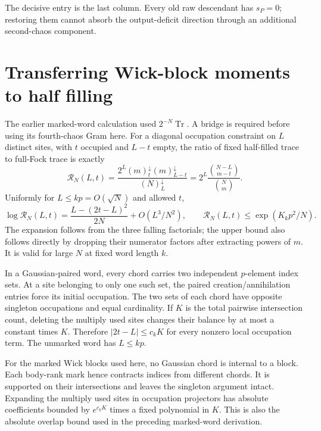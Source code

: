 \documentclass[11pt,a4paper]{article}
\begin{document}
The decisive entry is the last column. Every old raw descendant
has $s_P=0$; restoring them cannot absorb the output-deficit
direction through an additional second-chaos component.

\newpage
\section{Transferring Wick-block moments to half filling}
The earlier marked-word calculation used $2^{-N}\operatorname{Tr}$.
A bridge is required before using its fourth-chaos Gram here.
For a diagonal occupation constraint on $L$ distinct sites, with
$t$ occupied and $L-t$ empty, the ratio of fixed half-filled trace
to full-Fock trace is exactly
\begin{equation}
 \mathcal R_N(L,t)=
 \frac{2^L(m)_t^{\downarrow}(m)_{L-t}^{\downarrow}}
 {(N)_L^{\downarrow}}
 =2^L\frac{\binom{N-L}{m-t}}{\binom Nm}.\label{ratio}
\end{equation}
Uniformly for $L\leq kp=O(\sqrt N)$ and allowed $t$,
\begin{equation}
 \log\mathcal R_N(L,t)
 =\frac{L-(2t-L)^2}{2N}+O(L^3/N^2),\qquad
 \mathcal R_N(L,t)\leq \exp(K_kp^2/N).\label{ratioexpand}
\end{equation}
The expansion follows from the three falling factorials; the upper
bound also follows directly by dropping their numerator factors
after extracting powers of $m$. It is valid for large $N$ at fixed
word length $k$.

In a Gaussian-paired word, every chord carries two independent
$p$-element index sets. At a site belonging to only one such set,
the paired creation/annihilation entries force its initial occupation.
The two sets of each chord have opposite singleton occupations and
equal cardinality. If $K$ is the total pairwise intersection count,
deleting the multiply used sites changes their balance by at most
a constant times $K$. Therefore $|2t-L|\leq c_kK$ for every
nonzero local occupation term. The unmarked word has $L\leq kp$.

For the marked Wick blocks used here, no Gaussian chord is internal
to a block. Each body-rank mark hence contracts indices from
different chords. It is supported on their intersections and leaves
the singleton argument intact. Expanding the multiply used sites
in occupation projectors has absolute coefficients bounded by
$e^{c_kK}$ times a fixed polynomial in $K$. This is also the
absolute overlap bound used in the preceding marked-word derivation.
\end{document}
